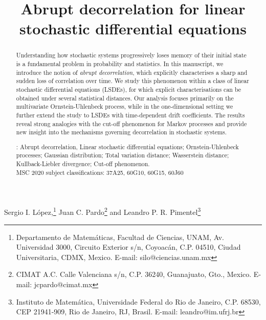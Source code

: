 \documentclass[12pt,thmsa]{article}
\begin{document}
\title{Abrupt decorrelation for linear stochastic differential equations}

\maketitle

\begin{center}
{\large Sergio I. L\'opez,}\footnote{Departamento de Matem\'aticas, Facultad de Ciencias, UNAM, Av. Universidad 3000, Circuito Exterior s/n, Coyoac\'an,  C.P. 04510, Ciudad Universitaria, CDMX, Mexico.  E-mail: silo@ciencias.unam.mx }
{\large Juan C. Pardo}\footnote{CIMAT A.C. Calle Valenciana s/n, C.P. 36240, Guanajuato, Gto., Mexico. E-mail: jcpardo@cimat.mx}{\large
 \mbox{} and Leandro P. R. Pimentel}\footnote{Instituto de Matem\'atica, Universidade Federal do Rio de Janeiro, C.P. 68530, CEP 21941-909, Rio de Janeiro, RJ, Brasil. E-mail: leandro@im.ufrj.br}
\end{center}
\vspace{0.2in}

\begin{abstract} 
Understanding how  stochastic systems progressively loses memory of their initial state is a fundamental problem in probability and statistics. In this manuscript, we introduce the notion of {\it abrupt decorrelation}, which explicitly characterises a sharp and sudden loss of correlation over time. We study this phenomenon within a class of linear stochastic differential equations (LSDEs), for which explicit characterisations can be obtained under several statistical distances. Our analysis focuses primarily on the multivariate Ornstein-Uhlenbeck process, while in the one-dimensional setting we further extend the study to LSDEs with time-dependent drift coefficients. The results reveal strong analogies with the cut-off phenomenon for Markov processes and provide new insight into the mechanisms governing decorrelation in stochastic systems. 

: Abrupt decorrelation, Linear stochastic differential equations; Ornstein-Uhlenbeck processes; Gaussian distribution; Total variation distance; Wasserstein distance; Kullback-Liebler divergence; Cut-off phenomenon.\\

\noindent MSC 2020 subject classifications:  37A25, 60G10, 60G15, 60J60
\end{abstract}

\vspace{0.5cm}
\end{document}
